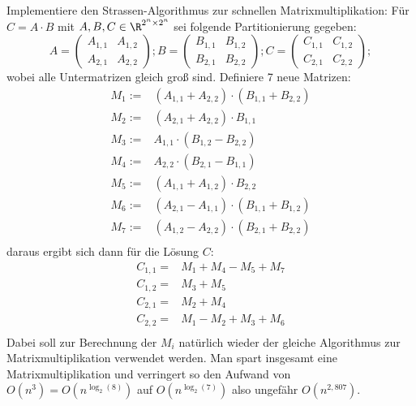 \begin{aufg}
Implementiere den Strassen-Algorithmus zur schnellen Matrixmultiplikation: Für $C = A \cdot B$ mit $A, B, C \in \R^{2^n \times 2^n}$ sei folgende Partitionierung gegeben: \[
A = \begin{pmatrix} A_{1,1} & A_{1,2} \\ A_{2,1} & A_{2,2} \end{pmatrix}; 
B = \begin{pmatrix} B_{1,1} & B_{1,2} \\ B_{2,1} & B_{2,2} \end{pmatrix}; 
C = \begin{pmatrix} C_{1,1} & C_{1,2} \\ C_{2,1} & C_{2,2} \end{pmatrix}; 
\] wobei alle Untermatrizen gleich groß sind. Definiere 7 neue Matrizen: 
\[ \begin{array}{rl}
M_1 := & (A_{1,1} + A_{2,2}) \cdot (B_{1,1} + B_{2,2}) \\
M_2 := & (A_{2,1} + A_{2,2}) \cdot B_{1,1} \\
M_3 := & A_{1,1} \cdot (B_{1,2} - B_{2,2}) \\
M_4 := & A_{2,2} \cdot (B_{2,1} - B_{1,1}) \\
M_5 := & (A_{1,1} + A_{1,2}) \cdot B_{2,2} \\
M_6 := & (A_{2,1} - A_{1,1}) \cdot (B_{1,1} + B_{1,2}) \\
M_7 := & (A_{1,2} - A_{2,2}) \cdot (B_{2,1} + B_{2,2}) \\
\end{array} \] daraus ergibt sich dann für die Lösung $C$: \[ \begin{array}{rl}
C_{1,1} = & M_1 + M_4 - M_5 + M_7 \\
C_{1,2} = & M_3 + M_5 \\
C_{2,1} = & M_2 + M_4 \\
C_{2,2} = & M_1 - M_2 + M_3 + M_6 \\
\end{array} \] Dabei soll zur Berechnung der $M_i$ natürlich wieder der gleiche Algorithmus zur Matrixmultiplikation verwendet werden. Man spart insgesamt eine Matrixmultiplikation und verringert so den Aufwand von $O(n^3) = O(n^{\log_2(8)})$ auf $O(n^{\log_2(7)})$ also ungefähr $O(n^{2,807})$. 
\end{aufg}

